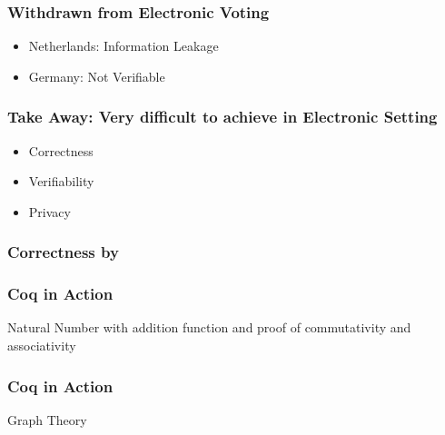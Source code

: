 \documentclass{beamer}
\begin{document}
\begin{frame}
\frametitle{Withdrawn from Electronic Voting}
\begin{itemize}
\item Netherlands: Information Leakage
\item Germany: Not Verifiable
\end{itemize}
\end{frame}


\begin{frame}
\frametitle{Take Away: Very difficult to achieve in Electronic Setting}
\begin{itemize}
\item Correctness
\item Verifiability
\item Privacy
\end{itemize}
\end{frame}



\begin{frame}
\frametitle{Correctness by }
\begin{center}
\end{center}
\end{frame}

\begin{frame}
\frametitle{Coq in Action}
{Natural Number with addition function and proof of 
commutativity and associativity}
\lsteighteen
\end{frame}


\begin{frame}
\frametitle{Coq in Action}
{Graph Theory}
\lstf
\end{frame}
\end{document}
